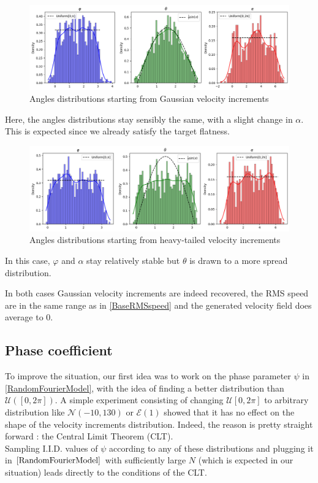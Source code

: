 \documentclass[a4paper,12pt]{article}
\theoremstyle{definition}
\begin{document}
\begin{figure}[H]
    \centering
    \includegraphics[width=1.0\linewidth]{illustrations/StartGaussian.png}
    \caption{Angles distributions starting from Gaussian velocity increments}
\end{figure}

Here, the angles distributions stay sensibly the same, with a slight change in $\alpha$. This is expected since we already satisfy the target flatness.

\begin{figure}[H]
    \centering
    \includegraphics[width=1.0\linewidth]{illustrations/StartHeavyTail.png}
    \caption{Angles distributions starting from heavy-tailed velocity increments}
\end{figure}

In this case, $\varphi$ and $\alpha$ stay relatively stable but $\theta$ is drawn to a more spread distribution. 

\bigskip
In both cases Gaussian velocity increments are indeed recovered, the RMS speed are in the same range as in \ref{BaseRMSspeed} and the generated velocity field does average to 0.

\subsection{Phase coefficient}
To improve the situation, our first idea was to work on the phase parameter $\psi$ in \ref{RandomFourierModel}, with the idea of finding a better distribution than $\mathcal{U}([0,2\pi])$. A simple experiment consisting of changing $\mathcal{U}[0,2\pi]$ to arbitrary distribution like $\mathcal{N}(-10,130)$ or $\mathcal{E}(1)$ showed that it has no effect on the shape of the velocity increments distribution. Indeed, the reason is pretty straight forward : the Central Limit Theorem (CLT). \\
Sampling I.I.D. values of $\psi$ according to any of these distributions and plugging it in $\ref{RandomFourierModel}$ with sufficiently large $N$ (which is expected in our situation) leads directly to the conditions of the CLT.
\end{document}
